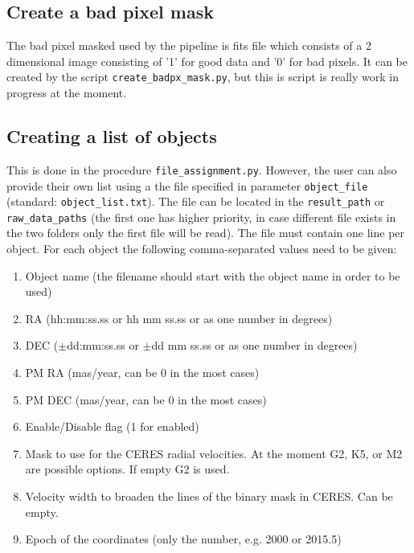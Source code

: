 \documentclass[10pt,a4paper]{article}
\begin{document}


\subsection{Create a bad pixel mask}
\label{Section:create_badpxmask}
\noindent The bad pixel masked used by the pipeline is fits file which consists of a 2 dimensional image consisting of '1' for good data and '0' for bad pixels. It can be created by the script \verb|create_badpx_mask.py|, but this is script is really work in progress at the moment.


\subsection{Creating a list of objects}
\label{Section:create_object_list_file}
This is done in the procedure \verb|file_assignment.py|. However, the user can also provide their own list using a the file specified in parameter \verb|object_file| (standard: \verb|object_list.txt|). The file can be located in the \verb|result_path| or \verb|raw_data_paths| (the first one has higher priority, in case different file exists in the two folders only the first file will be read). The file must contain one line per object. For each object the following comma-separated values need to be given:
\begin{enumerate}\setlength\itemsep{0em}
 \item Object name (the filename should start with the object name in order to be used)
 \item RA (hh:mm:ss.ss or hh mm ss.ss or as one number in degrees)
 \item DEC ($\pm$dd:mm:ss.ss or $\pm$dd mm ss.ss or as one number in degrees)
 \item PM RA (mas/year, can be 0 in the most cases)
 \item PM DEC (mas/year, can be 0 in the most cases)
 \item Enable/Disable flag (1 for enabled)
 \item Mask to use for the CERES radial velocities. At the moment G2, K5, or M2 are possible options. If empty G2 is used.
 \item Velocity width to broaden the lines of the binary mask in CERES. Can be empty.
 \item Epoch of the coordinates (only the number, e.g. 2000 or 2015.5)
\end{enumerate}
\end{document}
